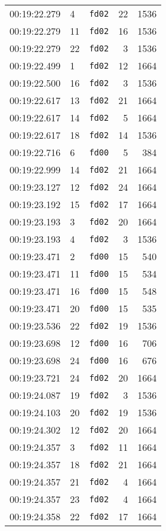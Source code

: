 \documentclass{article}
\begin{document}
\begin{longtable}{lllrr}
00:19:22.279 & 4 & \texttt{fd02} & 22 & 1536 \\
00:19:22.279 & 11 & \texttt{fd02} & 16 & 1536 \\
00:19:22.279 & 22 & \texttt{fd02} & 3 & 1536 \\
00:19:22.499 & 1 & \texttt{fd02} & 12 & 1664 \\
00:19:22.500 & 16 & \texttt{fd02} & 3 & 1536 \\
00:19:22.617 & 13 & \texttt{fd02} & 21 & 1664 \\
00:19:22.617 & 14 & \texttt{fd02} & 5 & 1664 \\
00:19:22.617 & 18 & \texttt{fd02} & 14 & 1536 \\
00:19:22.716 & 6 & \texttt{fd00} & 5 & 384 \\
00:19:22.999 & 14 & \texttt{fd02} & 21 & 1664 \\
00:19:23.127 & 12 & \texttt{fd02} & 24 & 1664 \\
00:19:23.192 & 15 & \texttt{fd02} & 17 & 1664 \\
00:19:23.193 & 3 & \texttt{fd02} & 20 & 1664 \\
00:19:23.193 & 4 & \texttt{fd02} & 3 & 1536 \\
00:19:23.471 & 2 & \texttt{fd00} & 15 & 540 \\
00:19:23.471 & 11 & \texttt{fd00} & 15 & 534 \\
00:19:23.471 & 16 & \texttt{fd00} & 15 & 548 \\
00:19:23.471 & 20 & \texttt{fd00} & 15 & 535 \\
00:19:23.536 & 22 & \texttt{fd02} & 19 & 1536 \\
00:19:23.698 & 12 & \texttt{fd00} & 16 & 706 \\
00:19:23.698 & 24 & \texttt{fd00} & 16 & 676 \\
00:19:23.721 & 24 & \texttt{fd02} & 20 & 1664 \\
00:19:24.087 & 19 & \texttt{fd02} & 3 & 1536 \\
00:19:24.103 & 20 & \texttt{fd02} & 19 & 1536 \\
00:19:24.302 & 12 & \texttt{fd02} & 20 & 1664 \\
00:19:24.357 & 3 & \texttt{fd02} & 11 & 1664 \\
00:19:24.357 & 18 & \texttt{fd02} & 21 & 1664 \\
00:19:24.357 & 21 & \texttt{fd02} & 4 & 1664 \\
00:19:24.357 & 23 & \texttt{fd02} & 4 & 1664 \\
00:19:24.358 & 22 & \texttt{fd02} & 17 & 1664 \\

\end{longtable}
\end{document}
